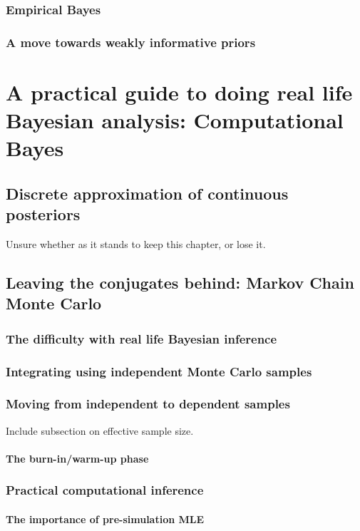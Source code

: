 \documentclass[11pt,fullpage]{book}
\begin{document}
\section{Empirical Bayes}
\section{A move towards weakly informative priors}



\part{A practical guide to doing real life Bayesian analysis: Computational Bayes}\label{part:computationalBayes}

\chapter{Discrete approximation of continuous posteriors}
Unsure whether as it stands to keep this chapter, or lose it.

\chapter{Leaving the conjugates behind: Markov Chain Monte Carlo}

\section{The difficulty with real life Bayesian inference}
\section{Integrating using independent Monte Carlo samples}
\section{Moving from independent to dependent samples}
Include subsection on effective sample size.

\subsection{The burn-in/warm-up phase}

\section{Practical computational inference}
\subsection{The importance of pre-simulation MLE}
\end{document}
